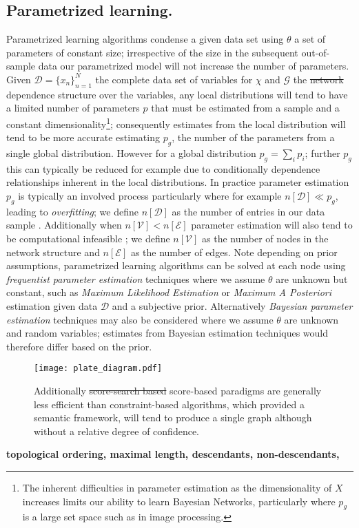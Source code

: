 \documentclass[7pt]{article}
\begin{document}
\subsection{Parametrized learning.}
Parametrized learning algorithms condense a given data set using $\theta$ a set of parameters of constant size; irrespective of the size in the subsequent out-of-sample data our parametrized model will not increase the number of parameters.  Given $\mathcal{D} = \{x_n \}_{n=1}^N$  the complete data set of variables for $\mathcal{\chi}$ and $\mathcal{G}$ the \st{network} dependence structure over the variables, any local distributions will tend to have a limited number of parameters $p$ that must be estimated from a sample and a constant dimensionality\footnote{The inherent difficulties in parameter estimation as the dimensionality of $X$ increases limits our ability to learn Bayesian Networks, particularly where $p_g$ is a large set space such as in image processing.}; consequently estimates from the local distribution will  tend to be more accurate estimating $p_g$, the number of the parameters from a single global distribution. However for a global distribution $p_g= \sum_{i} p_i $; further $p_g$  this can typically be reduced for example due to conditionally dependence relationships inherent in the local distributions. In practice parameter estimation $p_g$  is typically an involved process particularly where for example  $n[\mathcal{D}] \ll p_g$, leading to \emph{overfitting};  we define  $n[\mathcal{D}]$  as the number of entries in our data sample \cite{castelo2006robust, schafer2005learning, hastie2009elements}. Additionally when $n[\mathcal{V}]< n[\mathcal{E}]$  parameter estimation will also tend to be computational infeasible \cite{korb2010bayesian, koller2009probabilistic};  we define $n[\mathcal{V}]$ as the number of nodes in the network structure and $n[\mathcal{E}]$ as the number of edges. Note depending on prior assumptions, parametrized learning algorithms can be solved at each node using \emph{frequentist parameter estimation} techniques where we assume $\theta$ are unknown but constant, such as \emph{Maximum Likelihood Estimation} or \emph{Maximum A Posteriori} estimation given data $\mathcal{D}$ and a subjective prior. Alternatively \emph{Bayesian parameter estimation} techniques may also be considered where we assume $\theta$ are unknown and random variables; estimates from Bayesian estimation techniques would therefore differ based on the prior.
\begin{figure}
	\centering
	\texttt{[image: plate\_diagram.pdf]}
		\caption{Additionally \st{score-search based} score-based  paradigms are generally less efficient than constraint-based algorithms, which provided a semantic framework, will tend to produce a single graph although without a relative degree of confidence.}
\end{figure}
		



\textbf{topological ordering, maximal length, descendants, non-descendants, }
	
	
	
\end{document}
